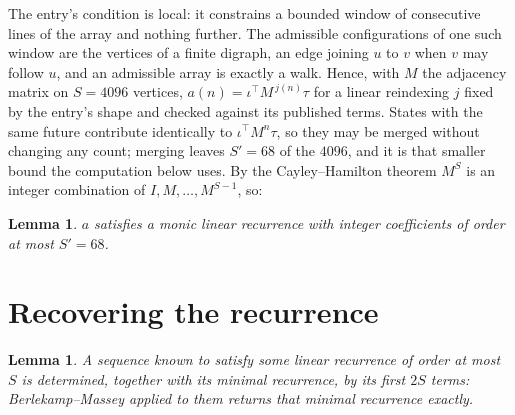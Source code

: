 \documentclass[11pt,a4paper]{article}
\theoremstyle{plain}
\newtheorem{lemma}[theorem]{Lemma}
\theoremstyle{definition}
\begin{document}
The entry's condition is local: it constrains a bounded window of consecutive lines of the
array and nothing further. The admissible configurations of one such window are the vertices
of a finite digraph, an edge joining $u$ to $v$ when $v$ may follow $u$, and an admissible
array is exactly a walk. Hence, with $M$ the adjacency matrix on $S=4096$ vertices,
$a(n)=\iota^{\!\top}M^{\,j(n)}\tau$ for a linear reindexing $j$ fixed by the entry's shape
and checked against its published terms. States with the same future contribute identically to $\iota^{\!\top}M^n\tau$, so they may be merged without changing any count; merging leaves $S'=68$ of the $4096$, and it is that smaller bound the computation below uses. By the Cayley--Hamilton theorem $M^{S}$ is an
integer combination of $I,M,\dots,M^{S-1}$, so:

\begin{lemma}\label{lem:cf}
$a$ satisfies a monic linear recurrence with integer coefficients of order at most
$S'=68$.
\end{lemma}

\section{Recovering the recurrence}

\begin{lemma}\label{lem:bm}
A sequence known to satisfy some linear recurrence of order at most $S$ is determined, together
with its minimal recurrence, by its first $2S$ terms: Berlekamp--Massey applied to them returns
that minimal recurrence exactly.
\end{lemma}
\end{document}

